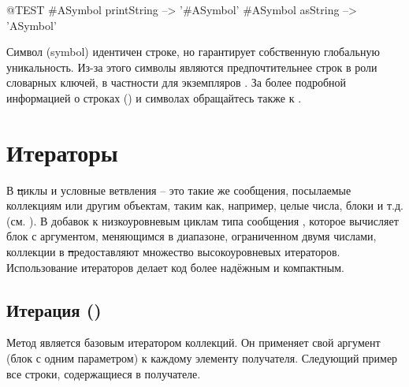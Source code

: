 \documentclass[a4paper,10pt,twoside]{book}
\begin{document}
\begin{code}{@TEST}
#ASymbol printString --> '#ASymbol'
#ASymbol asString    --> 'ASymbol'
\end{code}

Символ (symbol) идентичен строке, но гарантирует собственную глобальную уникальность. Из-за этого символы являются предпочтительнее строк в роли словарных ключей, в частности для экземпляров .
За более подробной информацией о строках () и символах  обращайтесь также к .

\section{Итераторы}

В \st циклы и условные ветвления -- это такие же сообщения, посылаемые коллекциям или другим объектам, таким как, например, целые числа, блоки и т.д. (см. ). В добавок к низкоуровневым циклам типа сообщения , которое вычисляет блок с аргументом, меняющимся в диапазоне, ограниченном двумя числами, коллекции в \st предоставляют множество высокоуровневых итераторов. Использование итераторов делает код более надёжным и компактным.

\subsection{Итерация ()}
Метод  является базовым итератором коллекций. Он применяет свой аргумент (блок с одним параметром) к каждому элементу получателя.
Следующий пример  все строки, содержащиеся в получателе.
\end{document}
